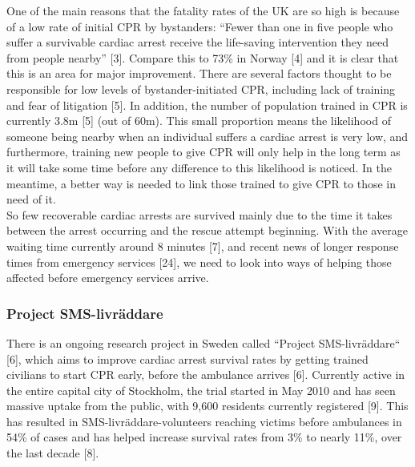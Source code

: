 \documentclass{article}
\begin{document}
One of the main reasons that the fatality rates of the UK are so high is because of a low rate of initial CPR by bystanders: “Fewer than one in five people who suffer a survivable cardiac arrest receive the life-saving intervention they need from people nearby” [3]. Compare this to 73\% in Norway [4] and it is clear that this is an area for major improvement. There are several factors thought to be responsible for low levels of bystander-initiated CPR, including lack of training and fear of litigation [5]. In addition, the number of population trained in CPR is currently 3.8m [5] (out of 60m). This small proportion means the likelihood of someone being nearby when an individual suffers a cardiac arrest is very low, and furthermore, training new people to give CPR will only help in the long term as it will take some time before any difference to this likelihood is noticed. In the meantime, a better way is needed to link those trained to give CPR to those in need of it.\\

So few recoverable cardiac arrests are survived mainly due to the time it takes between the arrest occurring and the rescue attempt beginning. With the average waiting time currently around 8 minutes [7], and recent news of longer response times from emergency services [24], we need to look into ways of helping those affected before emergency services arrive.\\
		\subsubsection{Project SMS-livräddare}
		
		There is an ongoing research project in Sweden called “Project SMS-livräddare“ [6], which aims to improve cardiac arrest survival rates by getting trained civilians to start CPR early, before the ambulance arrives [6]. Currently active in the entire capital city of Stockholm, the trial started in May 2010 and has seen massive uptake from the public, with 9,600 residents currently registered [9]. This has resulted in SMS-livräddare-volunteers reaching victims before ambulances in 54\% of cases and has helped increase survival rates from 3\% to nearly 11\%, over the last decade [8].\\
\end{document}
